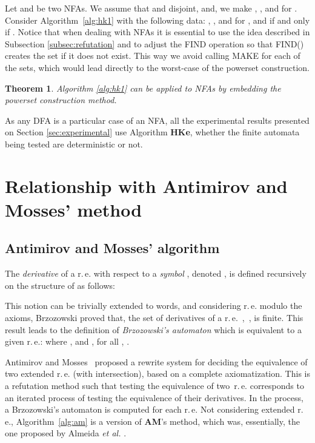 \documentclass[copyright]{eptcs}
\newtheorem{theorem}{Theorem}
\newcommand{\dfa}{DFA\xspace}
\newcommand{\nfa}{NFA\xspace}
\newcommand{\nfas}{NFAs\xspace}
\newcommand{\ACI}{\xspace}
\newcommand{\re}{r.\,e.\xspace}
\newcommand{\hke}{\textbf{HKe}\xspace}
\newcommand{\am}{\textbf{AM}\xspace}
\begin{document}
Let  and  be two NFAs. We assume that  and 
disjoint, and, we make , , and
 for .
Consider Algorithm~\ref{alg:hk1} with the following data: ,
, and for ,  and  if and only if . Notice that when dealing with \nfas it is essential to
use the idea described in Subsection \ref{subsec:refutation} and to
adjust the FIND operation so that FIND() creates the set  if
it does not exist. This way we avoid calling MAKE for each of the
 sets, which would lead directly to the worst-case of the
powerset construction.
\begin{theorem}
  Algorithm \ref{alg:hk1} can be applied to NFAs by embedding the
  powerset construction method.
\end{theorem}

As any \dfa is a particular case of an \nfa, all the experimental
results presented on Section \ref{sec:experimental} use Algorithm
\hke, whether the finite automata being tested are deterministic or
not.


\section{Relationship with Antimirov and Mosses' method}
\label{sec:relationship_with_am}

\subsection{Antimirov and Mosses' algorithm}
\label{sec:am}

The \emph{derivative} \cite{brzozowski64:_deriv_of_regul_expres} of a
\re  with respect to a \emph{symbol} , denoted
, is defined recursively on the structure of
 as follows: {

} 

This notion can be trivially extended to words, and considering \re
modulo the \ACI axioms, Brzo\-zow\-ski
\cite{brzozowski64:_deriv_of_regul_expres} proved that, the set of
derivatives of a \re~,~, is finite. This
result leads to the definition of \emph{Brzozowski's automaton} which
is equivalent to a given \re :  where
\hbox{}, and
, for all , .

Antimirov and Mosses~\cite{antimirov94:_rewrit_exten_regul_expres}
proposed a rewrite system for deciding the equivalence of two extended \re 
(with intersection), based on a complete axiomatization. This is a
refutation method such that testing the equivalence of two~\re
corresponds to an iterated process of testing the equivalence of their
derivatives. In the process, a Brzozowski's automaton is computed for
each \re Not considering extended \re, Algorithm~\ref{alg:am} is a
version of \am's method, which was, essentially, the one proposed by
Almeida \emph{et al.}
\cite{almeida08_c:_antim_and_mosses_rewrit_system_revis}.
\vspace{-0.3cm}
\end{document}
